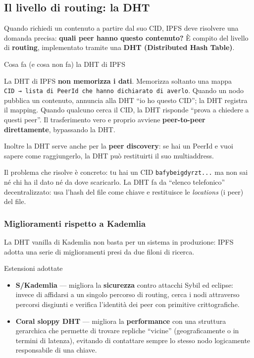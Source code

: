 \documentclass[
  italian,
  openany]{book}
\providecommand{\tightlist}{%
  \setlength{\itemsep}{0pt}\setlength{\parskip}{0pt}}
\begin{document}
\subsection{Il livello di routing: la
DHT}\label{il-livello-di-routing-la-dht}

Quando richiedi un contenuto a partire dal suo CID, IPFS deve risolvere
una domanda precisa: \textbf{quali peer hanno questo contenuto?} È
compito del livello di \textbf{routing}, implementato tramite una
\textbf{DHT (Distributed Hash Table)}.

\begin{calloutwarning}{Cosa fa (e cosa non fa) la DHT di IPFS}

La DHT di IPFS \textbf{non memorizza i dati}. Memorizza soltanto una
mappa
\texttt{CID\ →\ lista\ di\ PeerId\ che\ hanno\ dichiarato\ di\ averlo}.
Quando un nodo pubblica un contenuto, annuncia alla DHT ``io ho questo
CID''; la DHT registra il mapping. Quando qualcuno cerca il CID, la DHT
risponde ``prova a chiedere a questi peer''. Il trasferimento vero e
proprio avviene \textbf{peer-to-peer direttamente}, bypassando la DHT.

\end{calloutwarning}

Inoltre la DHT serve anche per la \textbf{peer discovery}: se hai un
PeerId e vuoi sapere come raggiungerlo, la DHT può restituirti il suo
multiaddress.

Il problema che risolve è concreto: tu hai un CID
\texttt{bafybeigdyrzt...} ma non sai né chi ha il dato né da dove
scaricarlo. La DHT fa da ``elenco telefonico'' decentralizzato: usa
l'hash del file come chiave e restituisce le \emph{locations} (i peer)
del file.

\subsubsection{Miglioramenti rispetto a
Kademlia}\label{miglioramenti-rispetto-a-kademlia}

La DHT vanilla di Kademlia non basta per un sistema in produzione: IPFS
adotta una serie di miglioramenti presi da due filoni di ricerca.

\begin{calloutnote}{Estensioni adottate}

\begin{itemize}
\tightlist
\item
  \textbf{S/Kademlia} --- migliora la \textbf{sicurezza} contro attacchi
  Sybil ed eclipse: invece di affidarsi a un singolo percorso di
  routing, cerca i nodi attraverso percorsi disgiunti e verifica
  l'identità dei peer con primitive crittografiche.
\item
  \textbf{Coral sloppy DHT} --- migliora la \textbf{performance} con una
  struttura gerarchica che permette di trovare repliche ``vicine''
  (geograficamente o in termini di latenza), evitando di contattare
  sempre lo stesso nodo logicamente responsabile di una chiave.
\end{itemize}

\end{calloutnote}
\end{document}
